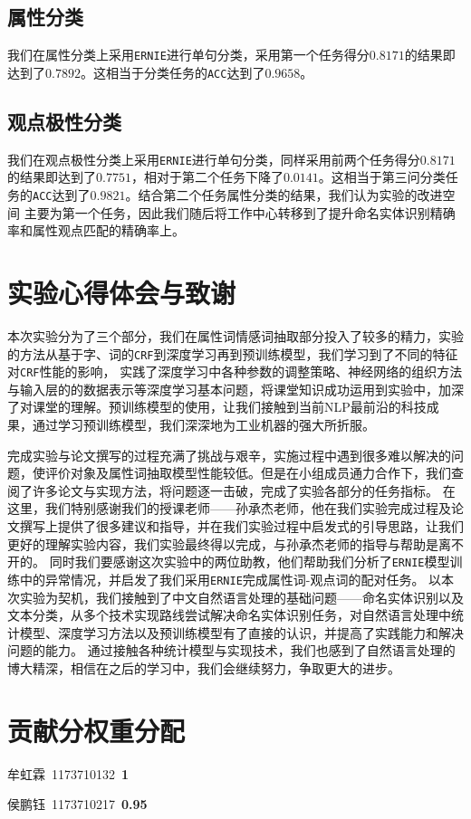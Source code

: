 \documentclass[11pt,a4paper]{article}
\begin{document}
\subsection{属性分类}
我们在属性分类上采用\texttt{ERNIE}进行单句分类，采用第一个任务得分$0.8171$的结果即达到了$0.7892$。这相当于分类任务的\texttt{ACC}达到了$0.9658$。

\subsection{观点极性分类}
我们在观点极性分类上采用\texttt{ERNIE}进行单句分类，同样采用前两个任务得分$0.8171$的结果即达到了$0.7751$，相对于第二个任务下降了$0.0141$。这相当于第三问分类任务的\texttt{ACC}达到了$0.9821$。结合第二个任务属性分类的结果，我们认为实验的改进空间
主要为第一个任务，因此我们随后将工作中心转移到了提升命名实体识别精确率和属性观点匹配的精确率上。

\section{实验心得体会与致谢}
本次实验分为了三个部分，我们在属性词情感词抽取部分投入了较多的精力，实验的方法从基于字、词的\texttt{CRF}到深度学习再到预训练模型，我们学习到了不同的特征对\texttt{CRF}性能的影响，
实践了深度学习中各种参数的调整策略、神经网络的组织方法与输入层的的数据表示等深度学习基本问题，将课堂知识成功运用到实验中，加深了对课堂的理解。预训练模型的使用，让我们接触到当前NLP最前沿的科技成果，通过学习预训练模型，我们深深地为工业机器的强大所折服。

完成实验与论文撰写的过程充满了挑战与艰辛，实施过程中遇到很多难以解决的问题，使评价对象及属性词抽取模型性能较低。但是在小组成员通力合作下，我们查阅了许多论文与实现方法，将问题逐一击破，完成了实验各部分的任务指标。
在这里，我们特别感谢我们的授课老师——孙承杰老师，他在我们实验完成过程及论文撰写上提供了很多建议和指导，并在我们实验过程中启发式的引导思路，让我们更好的理解实验内容，我们实验最终得以完成，与孙承杰老师的指导与帮助是离不开的。
同时我们要感谢这次实验中的两位助教，他们帮助我们分析了\texttt{ERNIE}模型训练中的异常情况，并启发了我们采用\texttt{ERNIE}完成属性词-观点词的配对任务。
以本次实验为契机，我们接触到了中文自然语言处理的基础问题——命名实体识别以及文本分类，从多个技术实现路线尝试解决命名实体识别任务，对自然语言处理中统计模型、深度学习方法以及预训练模型有了直接的认识，并提高了实践能力和解决问题的能力。
通过接触各种统计模型与实现技术，我们也感到了自然语言处理的博大精深，相信在之后的学习中，我们会继续努力，争取更大的进步。

\section{贡献分权重分配}
牟虹霖\ 1173710132\ \textbf{1}

侯鹏钰\ 1173710217\ \textbf{0.95}



\end{document}
